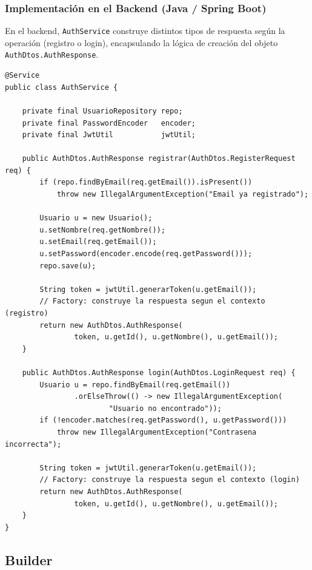 \documentclass{article}
\begin{document}
\subsubsection*{Implementaci\'on en el Backend (Java / Spring Boot)}
 
En el backend, \texttt{AuthService} construye distintos tipos de respuesta
seg\'un la operaci\'on (registro o login), encapsulando la l\'ogica de creaci\'on
del objeto \texttt{AuthDtos.AuthResponse}.
 
\begin{lstlisting}[style=javaStyle, caption={Creaci\'on de respuesta en AuthService (service/AuthService.java)}]
@Service
public class AuthService {
 
    private final UsuarioRepository repo;
    private final PasswordEncoder   encoder;
    private final JwtUtil           jwtUtil;
 
    public AuthDtos.AuthResponse registrar(AuthDtos.RegisterRequest req) {
        if (repo.findByEmail(req.getEmail()).isPresent())
            throw new IllegalArgumentException("Email ya registrado");
 
        Usuario u = new Usuario();
        u.setNombre(req.getNombre());
        u.setEmail(req.getEmail());
        u.setPassword(encoder.encode(req.getPassword()));
        repo.save(u);
 
        String token = jwtUtil.generarToken(u.getEmail());
        // Factory: construye la respuesta segun el contexto (registro)
        return new AuthDtos.AuthResponse(
                token, u.getId(), u.getNombre(), u.getEmail());
    }
 
    public AuthDtos.AuthResponse login(AuthDtos.LoginRequest req) {
        Usuario u = repo.findByEmail(req.getEmail())
                .orElseThrow(() -> new IllegalArgumentException(
                        "Usuario no encontrado"));
        if (!encoder.matches(req.getPassword(), u.getPassword()))
            throw new IllegalArgumentException("Contrasena incorrecta");
 
        String token = jwtUtil.generarToken(u.getEmail());
        // Factory: construye la respuesta segun el contexto (login)
        return new AuthDtos.AuthResponse(
                token, u.getId(), u.getNombre(), u.getEmail());
    }
}
\end{lstlisting}
 
\subsection{Builder}
 
\end{document}
